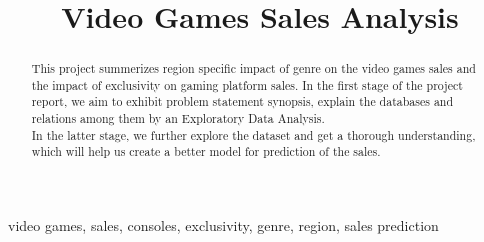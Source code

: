 \documentclass[conference]{IEEEtran}
\begin{document}
\title{Video Games Sales Analysis\\
}

\author{
    \and
}


\maketitle

\begin{abstract}
    This project summerizes region specific impact of genre on the video games sales and the impact of exclusivity on gaming platform sales.  In the first stage of the project report, we aim to exhibit problem statement synopsis, explain the databases and relations among them by an Exploratory Data Analysis.\\
    In the latter stage, we further explore the dataset and get a thorough understanding, which will help us create a better model for prediction of the sales.
\end{abstract}

\begin{IEEEkeywords}
    video games, sales, consoles, exclusivity, genre, region, sales prediction
\end{IEEEkeywords}
\end{document}
